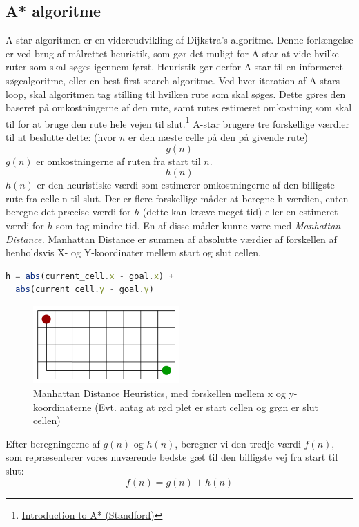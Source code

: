 \documentclass[12pt]{article}
\begin{document}
\subsection{A* algoritme}
A-star algoritmen er en videreudvikling af Dijkstra’s algoritme. Denne forlængelse er ved brug af målrettet heuristik, 
som gør det muligt for A-star at vide hvilke ruter som skal søges igennem først. 
Heuristik gør derfor A-star til en informeret søgealgoritme, eller en best-first search algoritme. 
Ved hver iteration af A-stars loop, skal algoritmen tag stilling til hvilken rute som skal søges. Dette gøres den baseret på omkostningerne af den rute, samt rutes estimeret omkostning som skal til for at bruge den rute hele vejen til slut.\footnote{\href{http://theory.stanford.edu/~amitp/GameProgramming/AStarComparison.html}{Introduction to A* (Standford)}} A-star brugere tre forskellige værdier til at beslutte dette: 
(hvor $n$ er den næste celle på den på givende rute)\\
\[g(n)\]
$g(n)$  er omkostningerne af ruten fra start til $n$.
\[h(n)\] 
$h(n)$ er den heuristiske værdi som estimerer omkostningerne af den billigste rute fra celle n til slut. 
Der er flere forskellige måder at beregne h værdien, enten beregne det præcise værdi for $h$ (dette kan kræve meget tid) eller en estimeret værdi for $h$ som tag mindre tid. En af disse måder kunne være med \textit{Manhattan Distance.} 
Manhattan Distance er summen af absolutte værdier af forskellen af henholdsvis X- og Y-koordinater mellem start og slut cellen. 
\begin{lstlisting}[language=JavaScript, caption=Manhattan Distance\label{code:Manhattan}]
  h = abs(current_cell.x - goal.x) + 
  abs(current_cell.y - goal.y)
\end{lstlisting}
\begin{figure}[ht]\label{fig:Manhattan}
  \centering
  \includegraphics[width=0.50\textwidth]{../manhattan.png}
  \caption{Manhattan Distance Heuristics, med forskellen mellem x og y-koordinaterne (Evt. antag at rød plet er start cellen og grøn er slut cellen)}
\end{figure}
Efter beregningerne af $g(n)$ og $h(n)$, beregner vi den tredje værdi $f(n)$, 
som repræsenterer vores nuværende bedste gæt til den billigste vej fra start til slut:
\[f(n)= g(n) + h(n)\]
\end{document}
